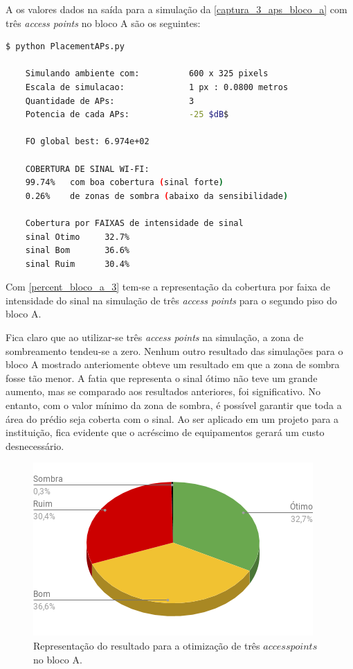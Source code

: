 \documentclass[
	12pt,				%
	twoside,			%
	a4paper,			%
	english,			%
	french,				%
	spanish,			%
	brazil				%
	]{abntex2}
\begin{document}
A os valores dados na saída para a simulação da
\autoref{captura_3_aps_bloco_a} com três \emph{access points} no bloco A
são os seguintes:

\begin{lstlisting}[language=bash]
    $ python PlacementAPs.py 
    
    Simulando ambiente com:          600 x 325 pixels
    Escala de simulacao:             1 px : 0.0800 metros
    Quantidade de APs:               3
    Potencia de cada APs:            -25 $dB$
    
    FO global best: 6.974e+02
    
    COBERTURA DE SINAL WI-FI:
    99.74%   com boa cobertura (sinal forte)
    0.26%    de zonas de sombra (abaixo da sensibilidade)
    
    Cobertura por FAIXAS de intensidade de sinal
    sinal Otimo     32.7%
    sinal Bom       36.6%
    sinal Ruim      30.4%
\end{lstlisting}

Com \autoref{percent_bloco_a_3} tem-se a representação da cobertura por
faixa de intensidade do sinal na simulação de três \emph{access points}
para o segundo piso do bloco A.

Fica claro que ao utilizar-se três \emph{access points} na simulação, a
zona de sombreamento tendeu-se a zero. Nenhum outro resultado das
simulações para o bloco A mostrado anteriomente obteve um resultado em
que a zona de sombra fosse tão menor. A fatia que representa o sinal
ótimo não teve um grande aumento, mas se comparado aos resultados
anteriores, foi significativo. No entanto, com o valor mínimo da zona de
sombra, é possível garantir que toda a área do prédio seja coberta com o
sinal. Ao ser aplicado em um projeto para a instituição, fica evidente
que o acréscimo de equipamentos gerará um custo desnecessário.

\begin{figure}[ht]
    \caption{\label{percent_bloco_a_3} Representação do resultado para a otimização 
     de três $access points$ no bloco A.}
    \begin{center}
        \includegraphics[scale=0.7]{imagens/percent-bloco-a-3.png}
    \end{center}
\end{figure}
\end{document}
